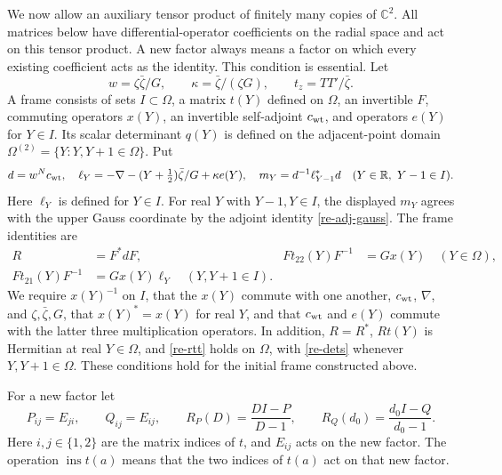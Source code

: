 We now allow an auxiliary tensor product of finitely many copies
of \(\mathbb C^2\).  All matrices below have differential-operator
coefficients on the radial space and act on this tensor product.
A new factor always means a factor on which every existing
coefficient acts as the identity.  This condition is essential.
Let
\[
 w=\zeta\bar\zeta/G,\qquad
 \kappa=\bar\zeta/(\zeta G),\qquad t_z=TT'/\bar\zeta.
\]
A frame consists of sets \(I\subset\Omega\), a matrix \(t(Y)\)
defined on \(\Omega\), an invertible \(F\), commuting operators
\(x(Y)\), an invertible self-adjoint \(c_{\rm wt}\), and
operators \(e(Y)\) for \(Y\in I\).  Its scalar determinant
\(q(Y)\) is defined on the adjacent-point domain
\(\Omega^{(2)}=\{Y:Y,Y+1\in\Omega\}\).  Put
\begin{equation}
 d=w^N c_{\rm wt},\quad
 \ell_Y=-\nabla-(Y+\tfrac12)\bar\zeta/G+\kappa e(Y),\quad
 m_Y=d^{-1}\ell_{Y-1}^*d
       \quad(Y\in\mathbb R,\ Y-1\in I).
                                                               \label{re-frame-data}
\end{equation}
Here \(\ell_Y\) is defined for \(Y\in I\).  For real \(Y\)
with \(Y-1,Y\in I\), the displayed \(m_Y\) agrees with
the upper Gauss coordinate by the adjoint identity
\eqref{re-adj-gauss}.
The frame identities are
\begin{align}
 R&=F^*dF,&
 Ft_{22}(Y)F^{-1}&=Gx(Y)\quad(Y\in\Omega),       \label{re-frame-main}\\
 Ft_{21}(Y)F^{-1}&=Gx(Y)\ell_Y
                    \quad(Y,Y+1\in I).        \label{re-frame-lower}
\end{align}
We require \(x(Y)^{-1}\) on \(I\), that the \(x(Y)\)
commute with one another, \(c_{\rm wt}\), \(\nabla\), and
\(\zeta,\bar\zeta,G\), that \(x(Y)^*=x(Y)\) for real \(Y\),
and that \(c_{\rm wt}\) and \(e(Y)\) commute with the latter
three multiplication operators.  In addition, \(R=R^*\),
\(Rt(Y)\) is Hermitian at real \(Y\in\Omega\), and
\eqref{re-rtt} holds on \(\Omega\), with
\eqref{re-dets} whenever \(Y,Y+1\in\Omega\).
These conditions hold for the initial frame constructed above.

For a new factor let
\begin{equation}
 P_{ij}=E_{ji},\qquad Q_{ij}=E_{ij},\qquad
 R_P(D)=\frac{DI-P}{D-1},\qquad
 R_Q(d_0)=\frac{d_0I-Q}{d_0-1}.
                                                               \label{re-fresh-matrices}
\end{equation}
Here \(i,j\in\{1,2\}\) are the matrix indices of \(t\),
and \(E_{ij}\) acts on the new factor.  The operation
\(\operatorname{ins}t(a)\) means that the two indices of
\(t(a)\) act on that new factor.

